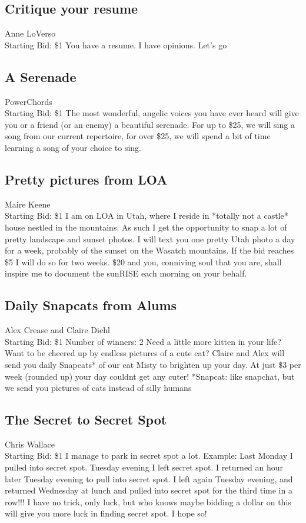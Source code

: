 \documentclass[11pt]{article}
\begin{document}
\subsection{Critique your resume}
Anne LoVerso
\\
Starting Bid: \$1
\newline
You have a resume.  I have opinions.  Let's go
\subsection{A Serenade}
PowerChords
\\
Starting Bid: \$1
\newline
The most wonderful, angelic voices you have ever heard will give you or a friend (or an enemy) a beautiful serenade. For up to \$25, we will sing a song from our current repertoire, for over \$25, we will spend a bit of time learning a song of your choice to sing.
\subsection{Pretty pictures from LOA}
Maire Keene
\\
Starting Bid: \$1
\newline
I am on LOA in Utah, where I reside in *totally not a castle* house nestled in the mountains. As such I get the opportunity to snap a lot of pretty landscape and sunset photos. I will text you one pretty Utah photo a day for a week, probably of the sunset on the Wasatch mountains. If the bid reaches \$5 I will do so for two weeks. \$20 and you, conniving soul that you are, shall inspire me to document the sunRISE each morning on your behalf.
\subsection{Daily Snapcats from Alums}
Alex Crease and Claire Diehl
\\
Starting Bid: \$1
\newline
Number of winners: 2
\newline
Need a little more kitten in your life? Want to be cheered up by endless pictures of a cute cat? Claire and Alex will send you daily Snapcats* of our cat Misty to brighten up your day. At just \$3 per week (rounded up) your day couldnt get any cuter!
*Snapcat: like snapchat, but we send you pictures of cats instead of silly humans
\subsection{The Secret to Secret Spot}
Chris Wallace
\\
Starting Bid: \$1
\newline
I manage to park in secret spot a lot. Example: Last Monday I pulled into secret spot. Tuesday evening I left secret spot. I returned an hour later Tuesday evening to pull into secret spot. I left again Tuesday evening, and returned Wednesday at lunch and pulled into secret spot for the third time in a row!!! I have no trick, only luck, but who knows maybe bidding a dollar on this will give you more luck in finding secret spot. I hope so!
\end{document}
